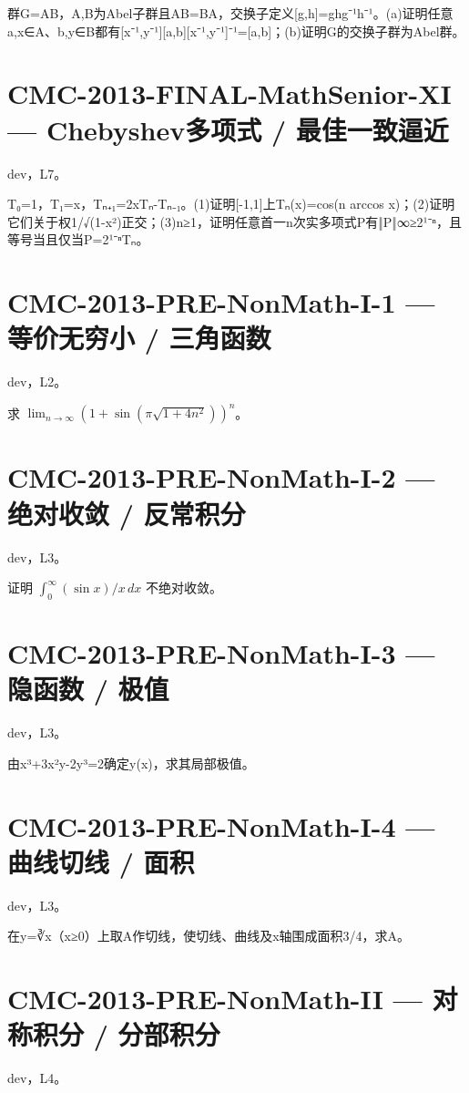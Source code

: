 \documentclass[UTF8]{ctexart}
\begin{document}
群G=AB，A,B为Abel子群且AB=BA，交换子定义[g,h]=ghg⁻¹h⁻¹。(a)证明任意a,x∈A、b,y∈B都有[x⁻¹,y⁻¹][a,b][x⁻¹,y⁻¹]⁻¹=[a,b]；(b)证明G的交换子群为Abel群。

\section*{CMC-2013-FINAL-MathSenior-XI — Chebyshev多项式 / 最佳一致逼近}

dev，L7。

T₀=1，T₁=x，Tₙ₊₁=2xTₙ-Tₙ₋₁。(1)证明[-1,1]上Tₙ(x)=cos(n arccos x)；(2)证明它们关于权1/√(1-x²)正交；(3)n≥1，证明任意首一n次实多项式P有‖P‖∞≥2¹⁻ⁿ，且等号当且仅当P=2¹⁻ⁿTₙ。

\section*{CMC-2013-PRE-NonMath-I-1 — 等价无穷小 / 三角函数}

dev，L2。

求 $\lim_{n\to\infty}(1+\sin(\pi\sqrt{1+4n^2}))^n$。

\section*{CMC-2013-PRE-NonMath-I-2 — 绝对收敛 / 反常积分}

dev，L3。

证明 $\int_0^\infty(\sin x)/x\,dx$ 不绝对收敛。

\section*{CMC-2013-PRE-NonMath-I-3 — 隐函数 / 极值}

dev，L3。

由x³+3x²y-2y³=2确定y(x)，求其局部极值。

\section*{CMC-2013-PRE-NonMath-I-4 — 曲线切线 / 面积}

dev，L3。

在y=∛x（x≥0）上取A作切线，使切线、曲线及x轴围成面积3/4，求A。

\section*{CMC-2013-PRE-NonMath-II — 对称积分 / 分部积分}

dev，L4。
\end{document}
